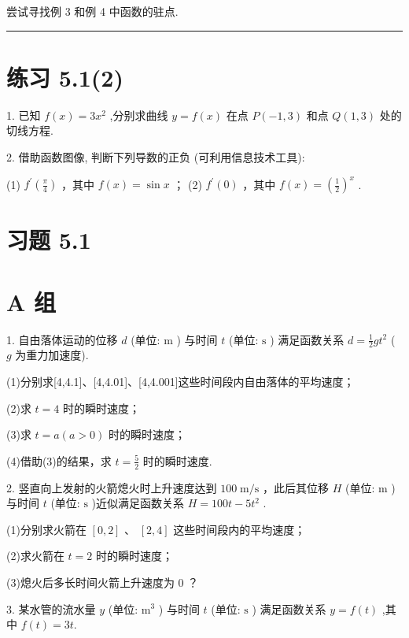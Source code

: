 \documentclass[10pt]{article}
\newcommand{\HRule}{\begin{center}\rule{0.9\linewidth}{0.2mm}\end{center}}
\begin{document}
尝试寻找例 3 和例 4 中函数的驻点.

\HRule

\section*{练习 5.1(2)}

1. 已知 \(f\left( x\right)  = 3{x}^{2}\) ,分别求曲线 \(y = f\left( x\right)\) 在点 \(P\left( {-1,3}\right)\) 和点 \(Q\left( {1,3}\right)\) 处的切线方程.

2. 借助函数图像, 判断下列导数的正负 (可利用信息技术工具):

(1) \({f}^{\prime }\left( \frac{\pi }{4}\right)\) ，其中 \(f\left( x\right)  = \sin x\) ； (2) \({f}^{\prime }\left( 0\right)\) ，其中 \(f\left( x\right)  = {\left( \frac{1}{2}\right) }^{x}\) .

\section*{习题 5.1}

\section*{A 组}

1. 自由落体运动的位移 \(d\) (单位: \(\mathrm{m}\) ) 与时间 \(t\) (单位: \(\mathrm{s}\) ) 满足函数关系 \(d = \frac{1}{2}g{t}^{2}\) ( \(g\) 为重力加速度).



(1)分别求[4,4.1]、[4,4.01]、[4,4.001]这些时间段内自由落体的平均速度；

(2)求 \(t = 4\) 时的瞬时速度；

(3)求 \(t = a\left( {a > 0}\right)\) 时的瞬时速度；

(4)借助(3)的结果，求 \(t = \frac{5}{2}\) 时的瞬时速度.

2. 竖直向上发射的火箭熄火时上升速度达到 \({100}\mathrm{\;m}/\mathrm{s}\) ，此后其位移 \(H\) (单位: \(\mathrm{m}\) )与时间 \(t\) (单位: \(\mathrm{s}\) )近似满足函数关系 \(H = {100t} - 5{t}^{2}\) .

(1)分别求火箭在 \(\left\lbrack  {0,2}\right\rbrack\) 、 \(\left\lbrack  {2,4}\right\rbrack\) 这些时间段内的平均速度；

(2)求火箭在 \(t = 2\) 时的瞬时速度；

(3)熄火后多长时间火箭上升速度为 0 ？

3. 某水管的流水量 \(y\) (单位: \({\mathrm{m}}^{3}\) ) 与时间 \(t\) (单位: \(\mathrm{s}\) ) 满足函数关系 \(y = f\left( t\right)\) ,其中 \(f\left( t\right)  = {3t}.\)
\end{document}
